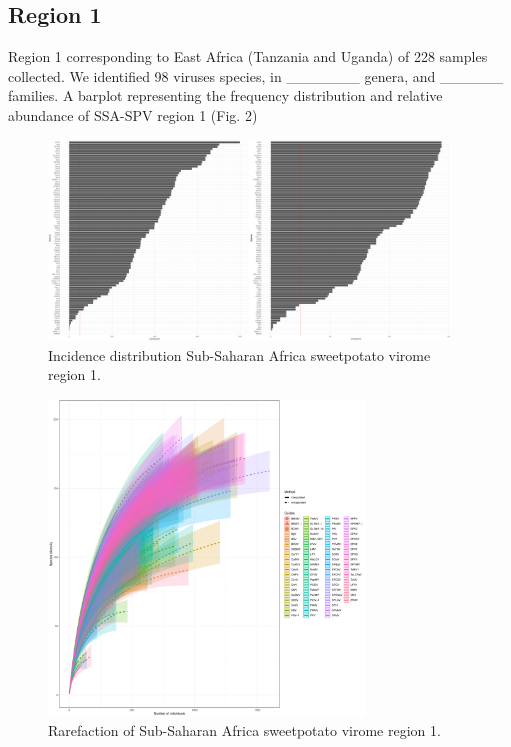 \documentclass{article}
\begin{document}
\subsection{Region 1}

Region 1 corresponding to East Africa (Tanzania and Uganda) of 228 samples collected. We identified 98 viruses species, in \_\_\_\_\_\_\_ genera, and \_\_\_\_\_\_ families.  A barplot representing the frequency distribution and relative abundance of SSA-SPV region 1 (Fig. 2)

\begin{figure}[h!]
\begin{center}
\includegraphics[width=0.95\textwidth]{../results/k-cluster1/1-kcluster_incidence_w+bFeb28.pdf
} %
\caption{Incidence distribution Sub-Saharan Africa sweetpotato virome region 1.}
\end{center}
\end{figure}


\begin{figure}[h!]
\begin{center}
\includegraphics[width=0.75\textwidth]{../results/k-cluster1/1-kcluster_rarefaction-iNEXT_Feb28.pdf
} %
\caption{Rarefaction of Sub-Saharan Africa sweetpotato virome region 1.}
\end{center}
\end{figure}
\end{document}
